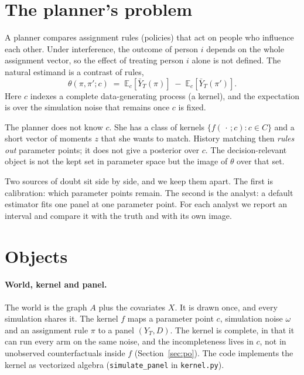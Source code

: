 \documentclass[11pt]{article}
\begin{document}
\section{The planner's problem}

A planner compares assignment rules (policies) that act on people who
influence each other. Under interference, the outcome of person $i$
depends on the whole assignment vector, so the effect of treating person
$i$ alone is not defined. The natural estimand is a contrast of rules,
\begin{equation}
  \theta(\pi,\pi';c)
  \;=\;
  \mathbb{E}_c\!\left[\bar Y_T(\pi)\right]
  \;-\;
  \mathbb{E}_c\!\left[\bar Y_T(\pi')\right].
\end{equation}
Here $c$ indexes a complete data-generating process (a kernel), and the
expectation is over the simulation noise that remains once $c$ is fixed.

The planner does not know $c$. She has a class of kernels $\{f(\,\cdot\,;c):c\in C\}$ and a
short vector of moments $z$ that she wants to match. History matching
then \emph{rules out} parameter points; it does not give a posterior
over $c$. The decision-relevant object is not the kept set in parameter
space but the image of $\theta$ over that set.

Two sources of doubt sit side by side, and we keep them apart. The first
is calibration: which parameter points remain. The second is the
analyst: a default estimator fits one panel at one parameter point. For
each analyst we report an interval and compare it with the truth and
with its own image.

\section{Objects}

\paragraph{World, kernel and panel.}
The world is the graph $A$ plus the covariates $X$. It is drawn once,
and every simulation shares it. The kernel $f$ maps a parameter point
$c$, simulation noise $\omega$ and an assignment rule $\pi$ to a panel $(Y_T,D)$. The
kernel is complete, in that it can run every arm on the same noise, and
the incompleteness lives in $c$, not in unobserved counterfactuals
inside $f$ (Section~\ref{sec:po}). The code implements the kernel as
vectorized algebra (\texttt{simulate\_panel} in \texttt{kernel.py}).
\end{document}
